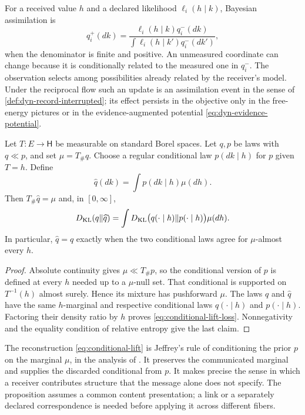 For a received value $h$ and a declared likelihood $\ell_i(h\mid k)$, Bayesian assimilation is
\begin{equation}
q_i^+(dk)=
\frac{\ell_i(h\mid k)q_i^-(dk)}{\int\ell_i(h\mid k')q_i^-(dk')},
\label{eq:bayesian-reception}
\end{equation}
when the denominator is finite and positive. An unmeasured coordinate can change because it is conditionally related to the measured one in $q_i^-$. The observation selects among possibilities already related by the receiver's model. Under the reciprocal flow such an update is an assimilation event in the sense of \cref{def:dyn-record-interrupted}; its effect persists in the objective only in the free-energy pictures or in the evidence-augmented potential \cref{eq:dyn-evidence-potential}.

Let $T:E\to\mathsf H$ be measurable on standard Borel spaces. Let $q,p$ be laws with $q\ll p$, and set $\mu=T_\#q$. Choose a regular conditional law $p(dk\mid h)$ for $p$ given $T=h$. Define
\begin{equation}
\widehat q(dk)=\int p(dk\mid h)\mu(dh).
\label{eq:conditional-lift}
\end{equation}
Then $T_\#\widehat q=\mu$ and, in $[0,\infty]$,
\begin{equation}
D_{\mathrm{KL}}(q\Vert\widehat q)
=\int D_{\mathrm{KL}}\bigl(q(\cdot\mid h)\Vert p(\cdot\mid h)\bigr)\mu(dh).
\label{eq:conditional-lift-loss}
\end{equation}
In particular, $\widehat q=q$ exactly when the two conditional laws agree for $\mu$-almost every $h$.
\begin{proof}
Absolute continuity gives $\mu\ll T_\#p$, so the conditional version of $p$ is defined at every $h$ needed up to a $\mu$-null set. That conditional is supported on $T^{-1}(h)$ almost surely. Hence its mixture has pushforward $\mu$. The laws $q$ and $\widehat q$ have the same $h$-marginal and respective conditional laws $q(\cdot\mid h)$ and $p(\cdot\mid h)$. Factoring their density ratio by $h$ proves \cref{eq:conditional-lift-loss}. Nonnegativity and the equality condition of relative entropy give the last claim.
\end{proof}

The reconstruction \cref{eq:conditional-lift} is Jeffrey's rule of conditioning the prior $p$ on the marginal $\mu$, in the analysis of \citet{DiaconisZabell1982}. It preserves the communicated marginal and supplies the discarded conditional from $p$. It makes precise the sense in which a receiver contributes structure that the message alone does not specify. The proposition assumes a common content presentation; a link or a separately declared correspondence is needed before applying it across different fibers.

